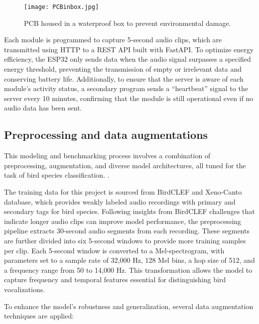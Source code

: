 \begin{figure}[h]
    \centering
    \texttt{[image: PCBinbox.jpg]}
    \caption{PCB housed in a waterproof box to prevent environmental damage.}
    \vspace{0.1cm}
    \label{fig:pcb_box}
\end{figure}


Each module is programmed to capture 5-second audio clips, which are transmitted using HTTP to a REST API built with FastAPI. To optimize energy efficiency, the ESP32 only sends data when the audio signal surpasses a specified energy threshold, preventing the transmission of empty or irrelevant data and conserving battery life. Additionally, to ensure that the server is aware of each module’s activity status, a secondary program sends a “heartbeat” signal to the server every 10 minutes, confirming that the module is still operational even if no audio data has been sent.

\subsection{Preprocessing and data augmentations}
This modeling and benchmarking process involves a combination of preprocessing, augmentation, and diverse model architectures, all tuned for the task of bird species classification. .

The training data for this project is sourced from BirdCLEF\cite{kahl2020overview} and Xeno-Canto\cite{conf/clef/VellingaP15} database, which provides weakly labeled audio recordings with primary and secondary tags for bird species. Following insights from BirdCLEF challenges that indicate longer audio clips can improve model performance, the preprocessing pipeline extracts 30-second audio segments from each recording. These segments are further divided into six 5-second windows to provide more training samples per clip. Each 5-second window is converted to a Mel-spectrogram, with parameters set to a sample rate of 32,000 Hz, 128 Mel bins, a hop size of 512, and a frequency range from 50 to 14,000 Hz. This transformation allows the model to capture frequency and temporal features essential for distinguishing bird vocalizations.

To enhance the model’s robustness and generalization, several data augmentation techniques are applied:

